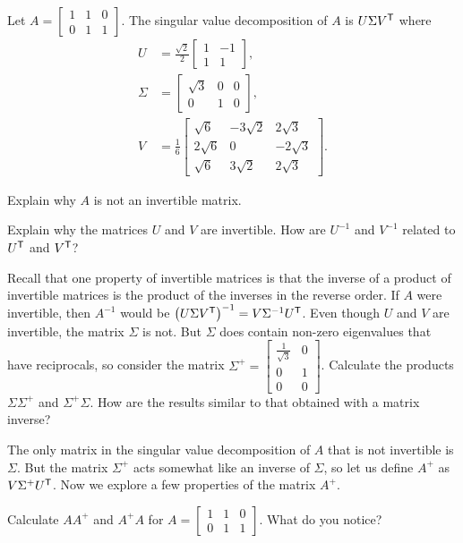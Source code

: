 \begin{pa} \label{pa:7_d_2} Let $A = \left[\begin{array}{ccc} 1&1&0\\ 0&1&1 \end{array} \right]$. The singular value decomposition of $A$ is $U \Sigma V^{\mathsf{T}}$ where
\begin{align*}
U &= \frac{\sqrt{2}}{2} \left[ \begin{array}{cr} 1&-1 \\ 1&1 \end{array} \right], \\
\Sigma &= \left[ \begin{array}{ccc} \sqrt{3}&0&0 \\ 0&1&0 \end{array} \right], \\ 
V &= \frac{1}{6} \left[ \begin{array}{rrr} \sqrt{6}&-3\sqrt{2}&2\sqrt{3} \\ 2\sqrt{6}&0&-2\sqrt{3} \\ \sqrt{6}&3\sqrt{2}&2\sqrt{3} \end{array} \right].
\end{align*}
\be
\item Explain why $A$ is not an invertible matrix.

\item Explain why the matrices $U$ and $V$ are invertible. How are $U^{-1}$ and $V^{-1}$ related to $U^{\mathsf{T}}$ and $V^{\mathsf{T}}$? 

\item Recall that one property of invertible matrices is that the inverse of a product of invertible matrices is the product of the inverses in the reverse order. If $A$ were invertible, then $A^{-1}$ would be $\left(U \Sigma V^{\mathsf{T}}\right)^{-1} = V \Sigma^{-1} U^{\mathsf{T}}$.  Even though $U$ and $V$ are invertible, the matrix $\Sigma$ is not. But $\Sigma$ does contain non-zero eigenvalues that have reciprocals, so consider the matrix $\Sigma^+ = \left[ \begin{array}{cc} \frac{1}{\sqrt{3}}&0 \\ 0&1 \\ 0&0 \end{array} \right]$. Calculate the products $\Sigma \Sigma^+$ and $\Sigma^+ \Sigma$. How are the results similar to that obtained with a matrix inverse? 

\item The only matrix in the singular value decomposition of $A$ that is not invertible is $\Sigma$. But the matrix $\Sigma^{+}$ acts somewhat like an inverse of $\Sigma$, so let us define  $A^+$ as $V \Sigma^+ U^{\mathsf{T}}$. Now we explore a few properties of the matrix $A^{+}$. 
	\ba
	\item Calculate $AA^+$ and $A^+A$ for $A = \left[\begin{array}{ccc} 1&1&0\\ 0&1&1 \end{array} \right]$. What do you notice?
 

\end{pa}
